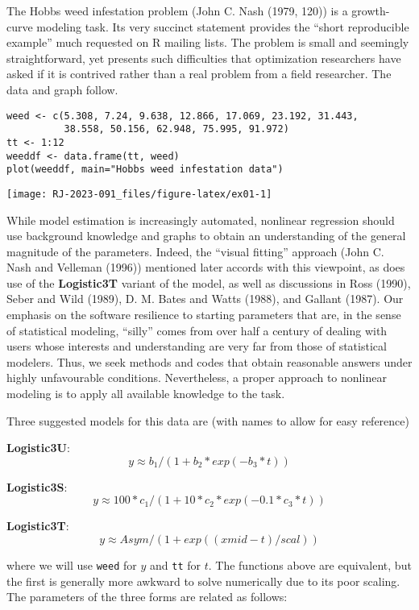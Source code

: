 The Hobbs weed infestation problem (John C. Nash (1979, 120)) is a growth-curve modeling
task. Its very succinct statement
provides the ``short reproducible example'' much requested on R mailing lists.
The problem is small and seemingly straightforward, yet presents such
difficulties that optimization researchers have asked if it is contrived
rather than a real problem from a field researcher. The data and graph follow.

\begin{verbatim}
weed <- c(5.308, 7.24, 9.638, 12.866, 17.069, 23.192, 31.443,
          38.558, 50.156, 62.948, 75.995, 91.972)
tt <- 1:12
weeddf <- data.frame(tt, weed)
plot(weeddf, main="Hobbs weed infestation data")
\end{verbatim}

\texttt{[image: RJ-2023-091\_files/figure-latex/ex01-1]}

While model estimation is increasingly automated, nonlinear regression
should use background knowledge and graphs to obtain an understanding of
the general magnitude of the parameters. Indeed, the ``visual fitting'' approach
(John C. Nash and Velleman (1996)) mentioned later accords with this viewpoint, as does use
of the \textbf{Logistic3T} variant of the model, as well as discussions in Ross (1990),
Seber and Wild (1989), D. M. Bates and Watts (1988), and Gallant (1987).
Our emphasis on the software resilience to starting parameters that are, in the
sense of statistical modeling, ``silly'' comes from over half a century of dealing
with users whose interests and understanding are very far from those of statistical
modelers. Thus, we seek methods and codes that obtain reasonable answers under
highly unfavourable conditions. Nevertheless, a proper approach to
nonlinear modeling is to apply all available knowledge to the task.

Three suggested models for this data are (with names to allow for easy reference)

\textbf{Logistic3U}:
\[  y \approx  b_1 / (1 + b_2 * exp(- b_3 * t)) \]

\textbf{Logistic3S}:
\[ y \approx  100 * c_1 / (1 + 10 * c_2 * exp(- 0.1 * c_3 * t)) \]

\textbf{Logistic3T}:
\[ y \approx Asym / (1 + exp((xmid - t)/scal)) \]

where we will use \texttt{weed} for \(y\) and \texttt{tt} for \(t\).
The functions above are equivalent, but the first is generally more awkward
to solve numerically due to its poor scaling. The parameters of the three forms
are related as follows:

